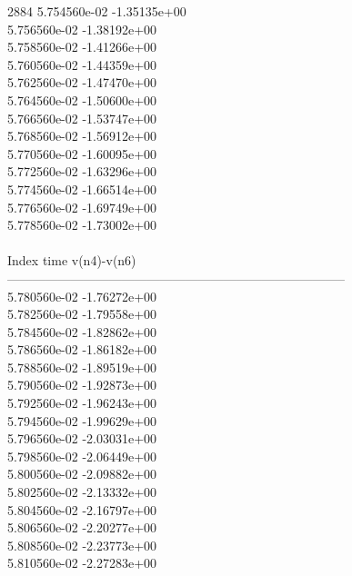2884	5.754560e-02	-1.35135e+00	\\ 	5.756560e-02	-1.38192e+00	\\ 	5.758560e-02	-1.41266e+00	\\ 	5.760560e-02	-1.44359e+00	\\ 	5.762560e-02	-1.47470e+00	\\ 	5.764560e-02	-1.50600e+00	\\ 	5.766560e-02	-1.53747e+00	\\ 	5.768560e-02	-1.56912e+00	\\ 	5.770560e-02	-1.60095e+00	\\ 	5.772560e-02	-1.63296e+00	\\ 	5.774560e-02	-1.66514e+00	\\ 	5.776560e-02	-1.69749e+00	\\ 	5.778560e-02	-1.73002e+00	\\ \hline
\\ \hline
Index   time            v(n4)-v(n6)     \\ \hline
--------------------------------------------------------------------------------\\ 	5.780560e-02	-1.76272e+00	\\ 	5.782560e-02	-1.79558e+00	\\ 	5.784560e-02	-1.82862e+00	\\ 	5.786560e-02	-1.86182e+00	\\ 	5.788560e-02	-1.89519e+00	\\ 	5.790560e-02	-1.92873e+00	\\ 	5.792560e-02	-1.96243e+00	\\ 	5.794560e-02	-1.99629e+00	\\ 	5.796560e-02	-2.03031e+00	\\ 	5.798560e-02	-2.06449e+00	\\ 	5.800560e-02	-2.09882e+00	\\ 	5.802560e-02	-2.13332e+00	\\ 	5.804560e-02	-2.16797e+00	\\ 	5.806560e-02	-2.20277e+00	\\ 	5.808560e-02	-2.23773e+00	\\ 	5.810560e-02	-2.27283e+00	\\ \hline
